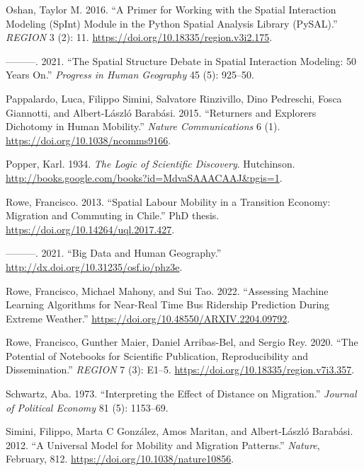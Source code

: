 \documentclass[11pt,letterpaper]{article}
\newlength{\cslhangindent}
\newlength{\cslentryspacingunit} %
\newenvironment{CSLReferences}[2] %
 {%
  \setlength{\parindent}{0pt}
  \ifodd #1
  \let\oldpar\par
  \def\par{\hangindent=\cslhangindent\oldpar}
  \fi
  \setlength{\parskip}{#2\cslentryspacingunit}
 }%
 {}
\begin{document}
\begin{CSLReferences}{1}{0}
\leavevmode{}%
Oshan, Taylor M. 2016. {``A Primer for Working with the Spatial Interaction Modeling (SpInt) Module in the Python Spatial Analysis Library (PySAL).''} \emph{REGION} 3 (2): 11. \url{https://doi.org/10.18335/region.v3i2.175}.

\leavevmode{}%
---------. 2021. {``The Spatial Structure Debate in Spatial Interaction Modeling: 50 Years On.''} \emph{Progress in Human Geography} 45 (5): 925--50.

\leavevmode{}%
Pappalardo, Luca, Filippo Simini, Salvatore Rinzivillo, Dino Pedreschi, Fosca Giannotti, and Albert-László Barabási. 2015. {``Returners and Explorers Dichotomy in Human Mobility.''} \emph{Nature Communications} 6 (1). \url{https://doi.org/10.1038/ncomms9166}.

\leavevmode{}%
Popper, Karl. 1934. \emph{The Logic of Scientific Discovery}. Hutchinson. \url{http://books.google.com/books?id=MdvaSAAACAAJ\&pgis=1}.

\leavevmode{}%
Rowe, Francisco. 2013. {``Spatial Labour Mobility in a Transition Economy: Migration and Commuting in Chile.''} PhD thesis. \url{https://doi.org/10.14264/uql.2017.427}.

\leavevmode{}%
---------. 2021. {``Big Data and Human Geography.''} \url{http://dx.doi.org/10.31235/osf.io/phz3e}.

\leavevmode{}%
Rowe, Francisco, Michael Mahony, and Sui Tao. 2022. {``Assessing Machine Learning Algorithms for Near-Real Time Bus Ridership Prediction During Extreme Weather.''} \url{https://doi.org/10.48550/ARXIV.2204.09792}.

\leavevmode{}%
Rowe, Francisco, Gunther Maier, Daniel Arribas-Bel, and Sergio Rey. 2020. {``The Potential of Notebooks for Scientific Publication, Reproducibility and Dissemination.''} \emph{REGION} 7 (3): E1--5. \url{https://doi.org/10.18335/region.v7i3.357}.

\leavevmode{}%
Schwartz, Aba. 1973. {``Interpreting the Effect of Distance on Migration.''} \emph{Journal of Political Economy} 81 (5): 1153--69.

\leavevmode{}%
Simini, Filippo, Marta C González, Amos Maritan, and Albert-László Barabási. 2012. {``A Universal Model for Mobility and Migration Patterns.''} \emph{Nature}, February, 812. \url{https://doi.org/10.1038/nature10856}.


\end{CSLReferences}
\end{document}
